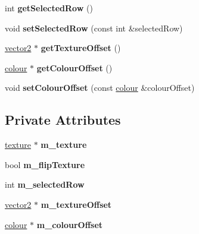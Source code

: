 \begin{DoxyCompactItemize}
int {\bfseries get\+Selected\+Row} ()
\item 
\mbox{\label{classflounder_1_1gui_a27cea6ffb465a8de4cbdfbd69ad2df4e}} 
void {\bfseries set\+Selected\+Row} (const int \&selected\+Row)
\item 
\mbox{\label{classflounder_1_1gui_a7daf537514e6bfb3155a8f63350971e5}} 
\hyperlink{classflounder_1_1vector2}{vector2} $\ast$ {\bfseries get\+Texture\+Offset} ()
\item 
\mbox{\label{classflounder_1_1gui_afcc8ae6ea69dc4b23c672895a476e595}} 
\hyperlink{classflounder_1_1colour}{colour} $\ast$ {\bfseries get\+Colour\+Offset} ()
\item 
\mbox{\label{classflounder_1_1gui_a220cfc75d2d7bb565fbb37d954b08f06}} 
void {\bfseries set\+Colour\+Offset} (const \hyperlink{classflounder_1_1colour}{colour} \&colour\+Offset)
\end{DoxyCompactItemize}
\subsection*{Private Attributes}
\begin{DoxyCompactItemize}
\item 
\mbox{\label{classflounder_1_1gui_a79436b6b873a5fc6b0c539242b1ee98d}} 
\hyperlink{classflounder_1_1texture}{texture} $\ast$ {\bfseries m\+\_\+texture}
\item 
\mbox{\label{classflounder_1_1gui_a3ff46ec0f4992a6b0b0099b02a1a20d3}} 
bool {\bfseries m\+\_\+flip\+Texture}
\item 
\mbox{\label{classflounder_1_1gui_a9574dbb0684eb23cc000707188f1922d}} 
int {\bfseries m\+\_\+selected\+Row}
\item 
\mbox{\label{classflounder_1_1gui_aa7281add10d424b2c44571a549857dbc}} 
\hyperlink{classflounder_1_1vector2}{vector2} $\ast$ {\bfseries m\+\_\+texture\+Offset}
\item 
\mbox{\label{classflounder_1_1gui_a075aab9ab9b066143ccce77cd6dca6dd}} 
\hyperlink{classflounder_1_1colour}{colour} $\ast$ {\bfseries m\+\_\+colour\+Offset}
\end{DoxyCompactItemize}


